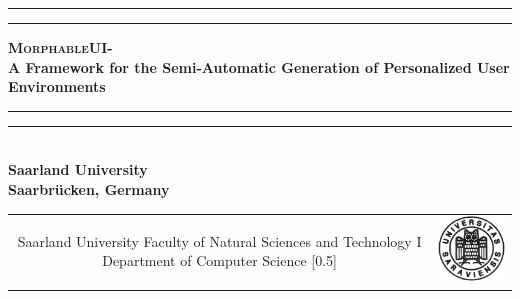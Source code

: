 \begin{titlepage}
{\jkfont%
\noindent\begin{flushright}
\noindent\rule{\linewidth}{.2mm}\vspace{-3mm}
\noindent\rule{\linewidth}{1mm}

\def\thetitle{\textsc{MorphableUI}- \\A Framework for the Semi-Automatic Generation of Personalized User Environments}

\noindent\huge\textbf{\thetitle}\end{flushright}
\vspace{5cm}
\noindent\begin{flushright}
\rule{.6\linewidth}{.2mm}\vspace{-3mm}
\rule{.6\linewidth}{1mm}

\vspace{2mm}
\\[1ex]
\textbf{Saarland University}\\
\textbf{Saarbr\"ucken, Germany}
\end{flushright}}

\vfill %

\begin{tabular}{cc}
\hspace*{-1cm}
\begin{minipage}[h]{.8\textwidth}
\begin{flushleft}
\large
	Saarland University
Faculty of Natural Sciences and Technology I
Department of Computer Science
  [0.5\baselineskip]
\end{flushleft}
\end{minipage}
&
\begin{minipage}[h]{4.2cm}
\includegraphics[bb=0 0 222 218, width=3cm]{images/eule2.png}
\end{minipage}
\end{tabular}
\end{titlepage}

%
%

